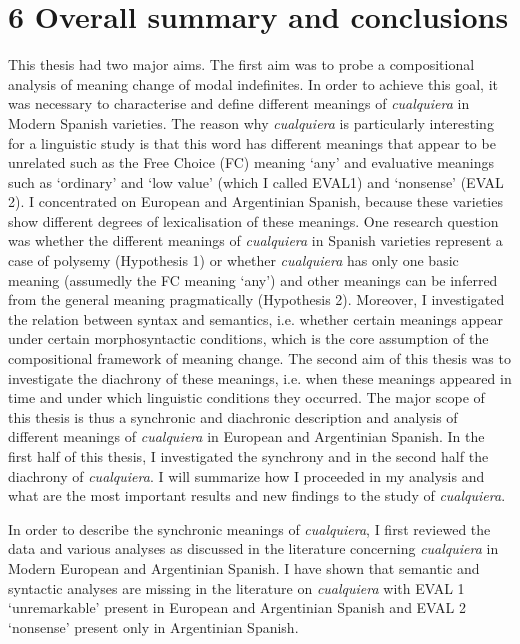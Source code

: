 \documentclass[output=paper]{langscibook}
\begin{document}
\section{6 Overall summary and conclusions}

This thesis had two major aims. The first aim was to probe a compositional analysis of meaning change of modal indefinites. In order to achieve this goal, it was necessary to characterise and define different meanings of \textit{cualquiera} in Modern Spanish varieties. The reason why \textit{cualquiera} is particularly interesting for a linguistic study is that this word has different meanings that appear to be unrelated such as the Free Choice (FC) meaning ‘any’ and evaluative meanings such as ‘ordinary’ and ‘low value’ (which I called EVAL1) and ‘nonsense’ (EVAL 2). I concentrated on European and Argentinian Spanish, because these varieties show different degrees of lexicalisation of these meanings. One research question was whether the different meanings of \textit{cualquiera} in Spanish varieties represent a case of polysemy (Hypothesis 1) or whether \textit{cualquiera} has only one basic meaning (assumedly the FC meaning ‘any’) and other meanings can be inferred from the general meaning pragmatically (Hypothesis 2). Moreover, I investigated the relation between syntax and semantics, i.e. whether certain meanings appear under certain morphosyntactic conditions, which is the core assumption of the compositional framework of meaning change. The second aim of this thesis was to investigate the diachrony of these meanings, i.e. when these meanings appeared in time and under which linguistic conditions they occurred. The major scope of this thesis is thus a synchronic and diachronic description and analysis of different meanings of \textit{cualquiera} in European and Argentinian Spanish. In the first half of this thesis, I investigated the synchrony and in the second half the diachrony of \textit{cualquiera}. I will summarize how I proceeded in my analysis and what are the most important results and new findings to the study of \textit{cualquiera}.

  In order to describe the synchronic meanings of \textit{cualquiera}, I first reviewed the data and various analyses as discussed in the literature concerning \textit{cualquiera} in Modern European and Argentinian Spanish. I have shown that semantic and syntactic analyses are missing in the literature on \textit{cualquiera} with EVAL 1 ‘unremarkable’ present in European and Argentinian Spanish and EVAL 2 ‘nonsense’ present only in Argentinian Spanish.
\end{document}
